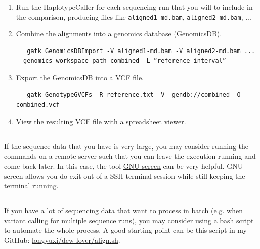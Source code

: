 \documentclass[12pt,letterpaper]{article}
\begin{document}
\begin{enumerate}
   \item Run the HaplotypeCaller for each sequencing run that you will to include in the comparison, producing files like \texttt{aligned1-md.bam}, \texttt{aligned2-md.bam}, ...
   \item Combine the alignments into a genomics database (GenomicsDB). \begin{verbatim}
   gatk GenomicsDBImport -V aligned1-md.bam -V aligned2-md.bam ... --genomics-workspace-path combined -L “reference-interval”
   \end{verbatim}
   \item Export the GenomicsDB into a VCF file. \begin{verbatim}
   gatk GenotypeGVCFs -R reference.txt -V -gendb://combined -O combined.vcf
   \end{verbatim}
   \item View the resulting VCF file with a spreadsheet viewer.
\end{enumerate}

\subsection{}

If the sequence data that you have is very large, you may consider running the commands on a remote server such that you can leave the execution running and come back later. In this case, the tool \href{https://www.gnu.org/software/screen/}{GNU screen} can be very helpful. GNU screen allows you do exit out of a SSH terminal session while still keeping the terminal running.

\subsection{}

If you have a lot of sequencing data that want to process in batch (e.g. when variant calling for multiple sequence runs), you may consider using a bash script to automate the whole process. A good starting point can be this script in my GitHub: \href{https://github.com/longyuxi/dew-lover/blob/master/align.sh}{longyuxi/dew-lover/align.sh}.
\end{document}
